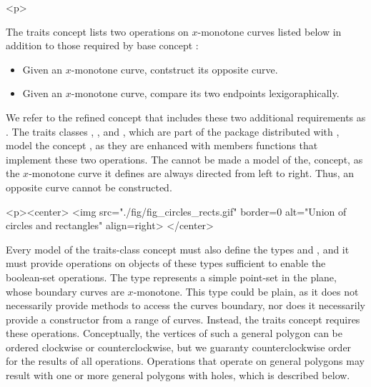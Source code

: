 \begin{ccHtmlOnly}<p>\end{ccHtmlOnly}
The traits concept lists two operations on $x$-monotone curves listed below
in addition to those required by base concept 
:
\begin{itemize}
\item Given an $x$-monotone curve, contstruct its opposite curve.
\item Given an $x$-monotone curve, compare its two endpoints lexigoraphically.
\end{itemize}
We refer to the refined concept that includes these two additional 
requirements as . The traits 
classes , , 
and , which are part of the  
package distributed with \cgal, model the concept 
, as they are enhanced with members
functions that implement these two operations.
The  cannot be made a model of the, 
 concept, as the
$x$-monotone curve it defines are always directed from left to right. Thus, an
opposite curve cannot be constructed.

\lcHtml{\label{fig:circle_segment}}
\begin{ccHtmlOnly}
  <p><center>
    <img src="./fig/fig_circles_rects.gif" border=0 alt="Union of circles
    and rectangles" align=right>
  </center>
\end{ccHtmlOnly}
Every model of the traits-class concept must also define the types
 and , and it
must provide operations on objects of these types sufficient to enable
the boolean-set operations.  The type  represents a
simple point-set in the plane, whose boundary curves are $x$-monotone.
This type could be plain, as it does not necessarily provide methods
to access the curves boundary, nor does it necessarily provide a
constructor from a range of curves. Instead, the traits concept
requires these operations. Conceptually, the vertices of such a
general polygon can be ordered clockwise or counterclockwise, but we
guaranty counterclockwise order for the results of all
operations. Operations that operate on general polygons may result
with one or more general polygons with holes, which is described
below.

